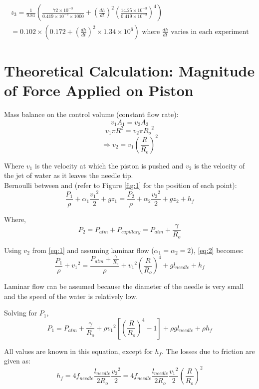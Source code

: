 \documentclass{article}
\newcommand*\circled[1]{\tikz[baseline=(char.base)]{
            \node[shape=circle,draw,inner sep=2pt] (char) {#1};}}
\begin{document}
\begin{multline*}
z_3 = \frac{1}{9.81} (\frac{72\times10^{-3}}{0.419\times10^{-3} \times 1000} + (\frac{dh}{dt})^2(\frac{14.25\times10^{-3}}{0.419\times10^{-3}})^4)\\= 0.102\times(0.172 + (\frac{dh}{dt})^2 \times1.34\times{10^6}) \textrm{ where $\frac{dh}{dt}$ varies in each experiment}
\end{multline*}

\section{Theoretical Calculation: Magnitude of Force Applied on  Piston}

Mass balance on the control volume (constant flow rate):
\[ v_{1}A_{1} = v_{2}A_{2} \]
\[ v_{1}\pi{R}^2 = v_{2}\pi{R_{o}}^2 \]
\[ \Rightarrow v_{2} = v_{1} \left(\frac{R}{R_{o}}\right)^2 \tag{1} \label{eq:1} \]

Where $v_{1}$ is the velocity at which the piston is pushed and $v_{2}$ is the velocity of the jet of water as it leaves the needle tip. \\

Bernoulli between \circled{1} and \circled{2} (refer to Figure \ref{fig:1} for the position of each point):
\[ \frac{P_{1}}{\rho} + \alpha_{1}\frac{{v_{1}}^2}{2}  + gz_{1} = \frac{P_{2}}{\rho} + \alpha_{2}\frac{{v_{2}}^2}{2}  + gz_{2} + h_{f} \tag{2} \label{eq:2} \]

Where,
\[ P_{2} = P_{atm} + P_{capillary}  = P_{atm} + \frac{\gamma}{R_{o}} \]


Using $v_{2}$ from \eqref{eq:1} and assuming laminar flow ($\alpha_{1} = \alpha_{2} = 2$), \eqref{eq:2} becomes:
\[ \frac{P_{1}}{\rho} + {v_{1}}^2 = \frac{P_{atm} + \frac{\gamma}{R_{o}}}{\rho} + {v_{1}}^2\left(\frac{R}{R_{o}}\right)^4  + gl_{needle} + h_{f} \]

Laminar flow can be assumed because the diameter of the needle is very small and the speed of the water is relatively low.

Solving for $P_{1}$,
\[ P_{1} = P_{atm} + \frac{\gamma}{R_{o}} + \rho{v_{1}}^2\left[\left(\frac{R}{R_{o}}\right)^4  - 1 \right] + \rho gl_{needle} + \rho h_{f} \tag{3} \label{eq:3} \]

All values are known in this equation, except for $h_{f}$. The losses due to friction are given as:
\[ h_{f} = 4f_{needle} \frac{l_{needle}}{2R_{o}} \frac{{v_{2}}^2}{2} = 4f_{needle} \frac{l_{needle}}{2R_{o}} \frac{{v_{1}}^2}{2} \left(\frac{R}{R_{o}}\right)^2 \tag{4} \label{eq:4} \]
\end{document}
